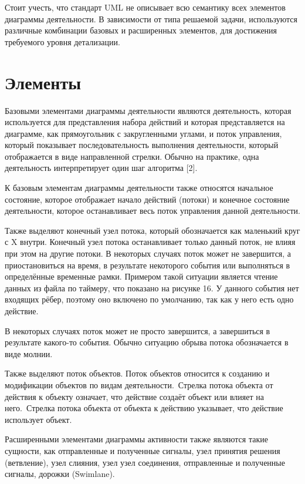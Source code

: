 Стоит учесть, что стандарт UML не описывает всю семантику всех элементов диаграммы деятельности. В зависимости от типа решаемой задачи, используются различные комбинации базовых и расширенных элементов, для достижения требуемого уровня детализации.  

\section{Элементы}

Базовыми элементами диаграммы деятельности являются деятельность, которая используется для представления набора действий и которая представляется на диаграмме, как прямоугольник с закругленными углами, и поток управления, который показывает последовательность выполнения деятельности, который отображается в виде направленной стрелки. Обычно на практике, одна деятельность интерпретирует один шаг алгоритма [2].

К базовым элементам диаграммы деятельности также относятся начальное состояние, которое отображает начало действий (потоки) и конечное состояние деятельности, которое останавливает весь поток управления данной деятельности.

Также выделяют конечный узел потока, который обозначается как маленький круг с X внутри. Конечный узел потока останавливает только данный поток, не влияя при этом на другие потоки. В некоторых случаях поток может не завершится, а приостановиться на время, в результате некоторого события или выполняться в определённые временные рамки. Примером такой ситуации является чтение данных из файла по таймеру, что показано на рисунке 16. У данного события нет входящих рёбер, поэтому оно включено по умолчанию, так как у него есть одно действие.

В некоторых случаях поток может не просто завершится, а завершиться в результате какого-то события. Обычно ситуацию обрыва потока обозначается в виде молнии.


Также выделяют поток объектов. Поток объектов относится к созданию и модификации объектов по видам деятельности. Стрелка потока объекта от действия к объекту означает, что действие создаёт объект или влияет на него. Стрелка потока объекта от объекта к действию указывает, что действие использует объект.


Расширенными элементами диаграммы активности также являются такие сущности, как отправленные и полученные сигналы, узел принятия решения (ветвление), узел слияния, узел узел соединения, отправленные и полученные сигналы, дорожки (Swimlane).

